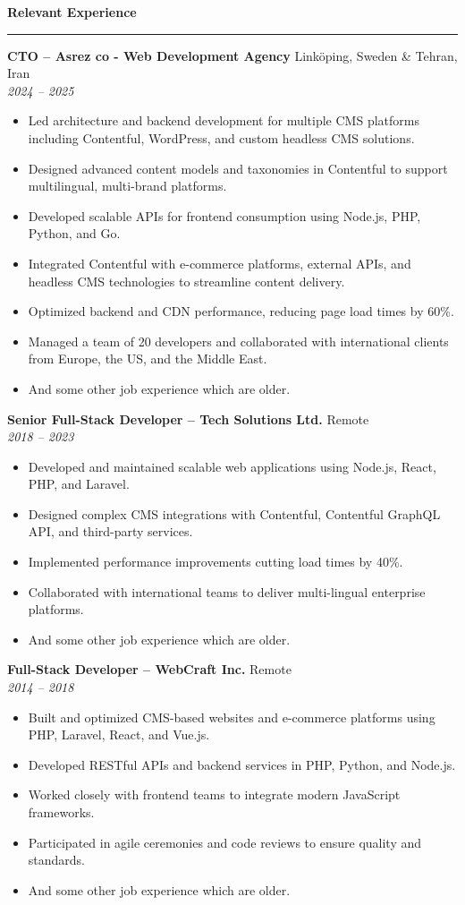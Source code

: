 \documentclass[a4paper,10pt]{article}
\newcommand{\sectiontitle}[1]{\vspace{6pt}\noindent\textbf{\large #1}\vspace{3pt}\hrule\vspace{6pt}}
\begin{document}
	\sectiontitle{Relevant Experience}
	
	\textbf{CTO – Asrez co - Web Development Agency} \hfill Linköping, Sweden \& Tehran, Iran\\
	\textit{2024 -- 2025}
	\begin{itemize}
		\item Led architecture and backend development for multiple CMS platforms including Contentful, WordPress, and custom headless CMS solutions.
		\item Designed advanced content models and taxonomies in Contentful to support multilingual, multi-brand platforms.
		\item Developed scalable APIs for frontend consumption using Node.js, PHP, Python, and Go.
		\item Integrated Contentful with e-commerce platforms, external APIs, and headless CMS technologies to streamline content delivery.
		\item Optimized backend and CDN performance, reducing page load times by 60\%.
		\item Managed a team of 20 developers and collaborated with international clients from Europe, the US, and the Middle East.
		\item And some other job experience which are older.
	\end{itemize}
	
	\textbf{Senior Full-Stack Developer – Tech Solutions Ltd.} \hfill Remote \\
	\textit{2018 -- 2023}
	\begin{itemize}
		\item Developed and maintained scalable web applications using Node.js, React, PHP, and Laravel.
		\item Designed complex CMS integrations with Contentful, Contentful GraphQL API, and third-party services.
		\item Implemented performance improvements cutting load times by 40\%.
		\item Collaborated with international teams to deliver multi-lingual enterprise platforms.
		\item And some other job experience which are older.
	\end{itemize}
	
	\textbf{Full-Stack Developer – WebCraft Inc.} \hfill Remote \\
	\textit{2014 -- 2018}
	\begin{itemize}
		\item Built and optimized CMS-based websites and e-commerce platforms using PHP, Laravel, React, and Vue.js.
		\item Developed RESTful APIs and backend services in PHP, Python, and Node.js.
		\item Worked closely with frontend teams to integrate modern JavaScript frameworks.
		\item Participated in agile ceremonies and code reviews to ensure quality and standards.
		\item And some other job experience which are older.
	\end{itemize}
	
\end{document}
